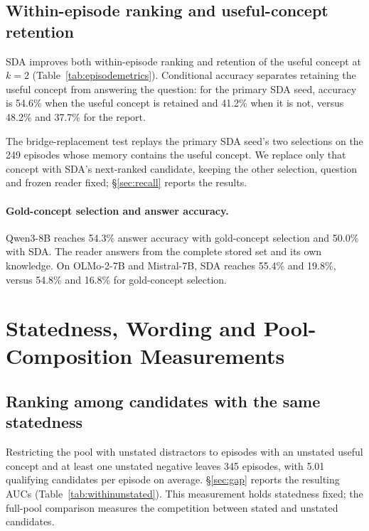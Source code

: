 \subsection{Within-episode ranking and useful-concept retention}
\label{app:episodemetrics}

SDA improves both within-episode ranking and retention of the useful
concept at $k=2$ (Table~\ref{tab:episodemetrics}).
Conditional accuracy separates retaining the useful concept from
answering the question: for the primary SDA seed, accuracy is 54.6\%
when the useful concept is retained and 41.2\% when it is not, versus
48.2\% and 37.7\% for the report.

The bridge-replacement test replays the primary SDA seed's two
selections on the 249 episodes whose memory contains the useful
concept. We replace only that concept with SDA's next-ranked
candidate, keeping the other selection, question and frozen reader
fixed; \S\ref{sec:recall} reports the results.



\paragraph{Gold-concept selection and answer accuracy.}
Qwen3-8B reaches 54.3\% answer accuracy with gold-concept selection and
50.0\% with SDA. The reader answers from the complete stored set and
its own knowledge. On OLMo-2-7B and Mistral-7B, SDA reaches 55.4\% and
19.8\%, versus 54.8\% and 16.8\% for gold-concept selection.
\section{Statedness, Wording and Pool-Composition Measurements}
\label{app:provenance}

\subsection{Ranking among candidates with the same statedness}
\label{app:withinprovenance}

Restricting the pool with unstated distractors to episodes with an
unstated useful concept and at least one unstated negative leaves
345 episodes, with 5.01 qualifying candidates per episode on average.
\S\ref{sec:gap} reports the resulting AUCs
(Table~\ref{tab:withinunstated}).
This measurement holds statedness fixed; the full-pool comparison
measures the competition between stated and unstated candidates.

